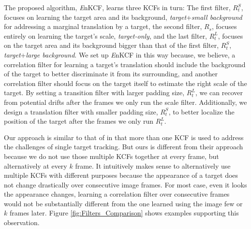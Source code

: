 \documentclass[10pt,twocolumn,letterpaper]{article}
\begin{document}
The proposed algorithm, {\it E}nKCF, learns three KCFs in turn: The
first filter, $R_{t}^{S}$, focuses on learning the target area and its
background, \textit{target}+\textit{small background} for addressing a
marginal translation by a target, the second filter, $R_{s}$, focuses
entirely on learning the target's scale, \textit{target-only}, and the
last filter, $R_{t}^{L}$, focuses on the target area and its
background bigger than that of the first filter, $R_{t}^{S}$,
\textit{target}+\textit{large background}. We set up {\it E}nKCF in
this way because, we believe, a correlation filter for learning a
target's translation should include the background of the target to
better discriminate it from its surrounding, and another correlation
filter should focus on the target itself to estimate the right scale
of the target. By setting a transition filter with larger padding
size, $R_{t}^{L}$, we can recover from potential drifts after the
frames we only run the scale filter. Additionally, we design a
translation filter with smaller padding size, $R_{t}^{S}$, to better
localize the position of the target after the frames we only run
$R_{t}^{L}$.

Our approach is similar to that of \cite{ma2015long} in that more than
one KCF is used to address the challenges of single target
tracking. But ours is different from their approach because we do not
use those multiple KCFs together at every frame, but alternatively at
every $k$ frame. It intuitively makes sense to alternatively use
multiple KCFs with different purposes because the appearance of a
target does not change drastically over consecutive image frames. For
most case, even it looks the appearance changes, learning a
correlation filter over consecutive frames would not be substantially different
from the one learned using the image few or $k$ frames later. Figure
\ref{fig:Filters_Comparison} shows examples supporting this
observation.
\end{document}
